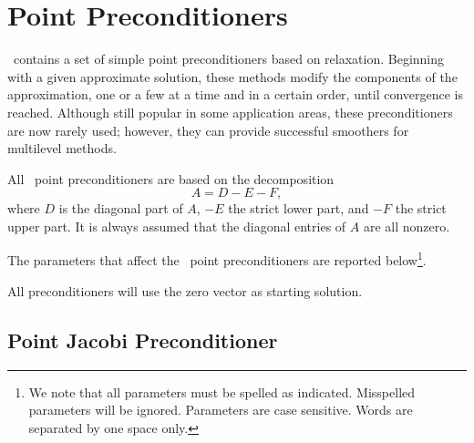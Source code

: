 \section{Point Preconditioners}
\label{sec:point}

\ifpack\ contains a set of simple point preconditioners based on relaxation.
Beginning with a given approximate solution, these methods modify the
components of the approximation, one or a few at a time and in a certain order,
until convergence is reached. Although still popular in some application
areas, these preconditioners are now
rarely used; however, they can provide successful smoothers for multilevel
methods. 

All \ifpack\ point preconditioners are based on the decomposition
\begin{equation}
\label{eq:splitting}
A = D - E - F,
\end{equation}
where $D$ is the diagonal part of $A$, $-E$ the strict lower part, and 
$-F$ the strict upper part. It is always assumed that the diagonal entries of
$A$ are all nonzero.

The parameters that affect the \ifpack\ point preconditioners are reported
below\footnote{We note that all parameters must be spelled as indicated.
  Misspelled parameters will be ignored. Parameters are case sensitive. Words
  are separated by one space only.}.

\smallskip


				 

\begin{remark}
All preconditioners will use the zero vector as starting solution.
\end{remark}

\subsection{Point Jacobi Preconditioner}
\label{sec:jacobi}

